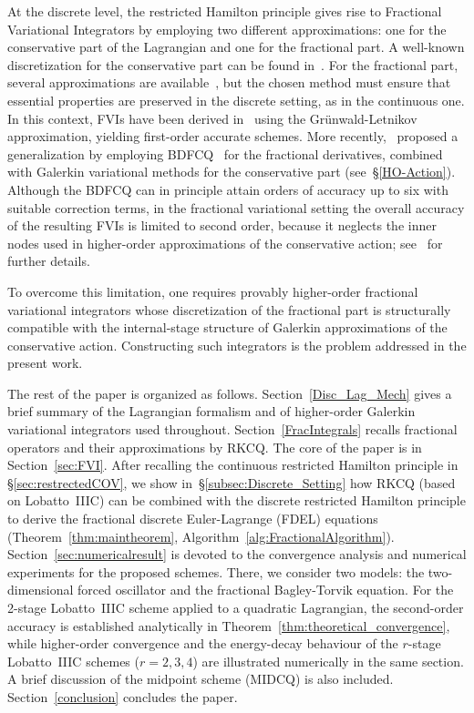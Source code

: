 \documentclass[a4paper,10pt,reqno]{amsart}
\theoremstyle{definition}
\begin{document}
At the discrete level, the restricted Hamilton principle gives rise to Fractional Variational Integrators by employing two different approximations: one for the conservative part of the  Lagrangian and one for the fractional part. A well-known discretization for the conservative part can be found in~\cite{MaWe,LuGeWa}. For the fractional part, several approximations are available~\cite{Lidia2015,BoXuHu,HandbookNum,Kaibook2016}, but the chosen method must ensure that essential properties are preserved in the discrete setting, as in the continuous one. In this context, FVIs have been derived in~\cite{JiOb2} using the Grünwald-Letnikov approximation, yielding first-order accurate schemes. More recently,~\cite{HaJiOb} proposed a generalization by employing BDFCQ~\cite{Lubich2} for the fractional derivatives, combined with Galerkin variational methods for the conservative part (see~\S\ref{HO-Action}). Although the BDFCQ can in principle attain orders of accuracy up to six with suitable correction terms, in the fractional variational setting the overall accuracy of the resulting FVIs is limited to second order, because it neglects the inner nodes used in higher-order approximations of the conservative action; see~\cite{HaJiOb} for further details.

To overcome this limitation, one requires provably higher-order fractional variational integrators whose discretization of the fractional part is structurally compatible with the internal-stage structure of Galerkin approximations of the conservative action. Constructing such integrators is the problem addressed in the present work.

The rest of the paper is organized as follows. Section~\ref{Disc_Lag_Mech} gives a brief summary of the Lagrangian formalism and of higher-order Galerkin variational integrators  used
throughout. Section~\ref{FracIntegrals} recalls fractional operators and their approximations by
RKCQ. The core of the paper is in Section~\ref{sec:FVI}. After recalling the continuous restricted Hamilton principle in \S\ref{sec:restrectedCOV}, we show in~\S\ref{subsec:Discrete_Setting} how RKCQ (based on Lobatto~IIIC) can be combined with the discrete restricted Hamilton principle to derive the fractional discrete Euler-Lagrange (FDEL) equations (Theorem~\ref{thm:maintheorem}, Algorithm~\ref{alg:FractionalAlgorithm}). Section~\ref{sec:numericalresult} is devoted to the convergence analysis and numerical experiments for the proposed schemes. There, we consider two 
  models: the two-dimensional forced oscillator and the fractional Bagley-Torvik equation. For the 2-stage Lobatto~IIIC scheme applied to a quadratic 
  Lagrangian, the second-order accuracy is established analytically in
  Theorem~\ref{thm:theoretical_convergence}, while higher-order convergence    and the energy-decay behaviour of the $r$-stage Lobatto~IIIC schemes ($r=2,3,4$) are illustrated numerically in the same section. A brief discussion of the midpoint scheme (MIDCQ) is also included. Section~\ref{conclusion} concludes the paper.
\end{document}
